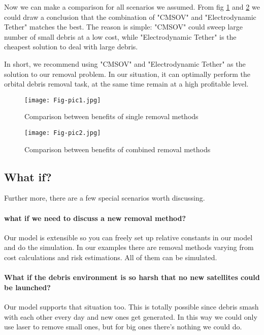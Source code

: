 \documentclass{mcmthesis}
\begin{document}
	Now we can make a comparison for all scenarios we assumed. From fig \ref{Fig-Compa1} and \ref{Fig-Compa2} we could draw a conclusion that the combination of "CMSOV" and "Electrodynamic Tether" matches the best. The reason is simple: "CMSOV" could sweep large number of small debris at a low cost, while "Electrodynamic Tether" is the cheapest solution to deal with large debris.
	
	In short, we recommend using "CMSOV" and "Electrodynamic Tether" as the solution to our removal problem. In our situation, it can optimally perform the orbital debris removal task, at the same time remain at a high profitable level.
	
	\begin{figure}[htbp]
		\centering
		\texttt{[image: Fig-pic1.jpg]}
		\caption{Comparison between benefits of single removal methods}
		\label{Fig-Compa1}
	\end{figure}
	\begin{figure}[htbp]
		\centering
		\texttt{[image: Fig-pic2.jpg]}
		\caption{Comparison between benefits of combined removal methods}
		\label{Fig-Compa2}
	\end{figure}
	
	\subsection{What if?}
	Further more, there are a few special scenarios worth discussing.
	
	\paragraph{what if we need to discuss a new removal method?}
	Our model is extensible so you can freely set up relative constants in our model and do the simulation. In our examples there are removal methods varying from cost calculations and risk estimations. All of them can be simulated.
	
	\paragraph{What if the debris environment is so harsh that no new satellites could be launched?}
	Our model supports that situation too. This is totally possible since debris smash with each other every day and new ones get generated. In this way we could only use laser to remove small ones, but for big ones there's nothing we could do.
\end{document}
